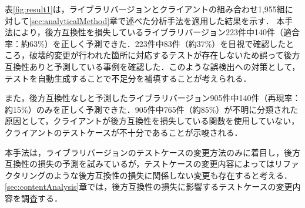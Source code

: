 \documentclass[submit]{ipsj}
\begin{document}
表\ref{fig:result1}は，ライブラリバージョンとクライアントの組み合わせ1,955組に対して\ref{sec:analyticalMethod}章で述べた分析手法を適用した結果を示す．
本手法により，後方互換性を損失しているライブラリバージョン223件中140件（適合率：約63\%）を正しく予測できた．223件中83件（約37\%）を目視で確認したところ，破壊的変更が行われた箇所に対応するテストが存在しないため誤って後方互換性ありと予測している事例を確認した．このような誤検出への対策として，テストを自動生成することで不足分を補填することが考えられる．

また，後方互換性なしと予測したライブラリバージョン905件中140件（再現率：約15\%）のみを正しく予測できた．905件中765件（約85\%）が不明に分類された原因として，クライアントが後方互換性を損失している関数を使用していない，クライアントのテストケースが不十分であることが示唆される．

本手法は，ライブラリバージョンのテストケースの変更方法のみに着目し，後方互換性の損失の予測を試みているが，テストケースの変更内容によってはリファクタリングのような後方互換性の損失に関係しない変更も存在すると考える．\ref{sec:contentAnalysis}章では，後方互換性の損失に影響するテストケースの変更内容を調査する．



\begin{table}[t]
  \centering
  \caption{テストコード変更有無に基づく後方互換性損失の検出結果}
  \label{fig:result1}
  \vspace{-5mm}
\end{table}
\end{document}
